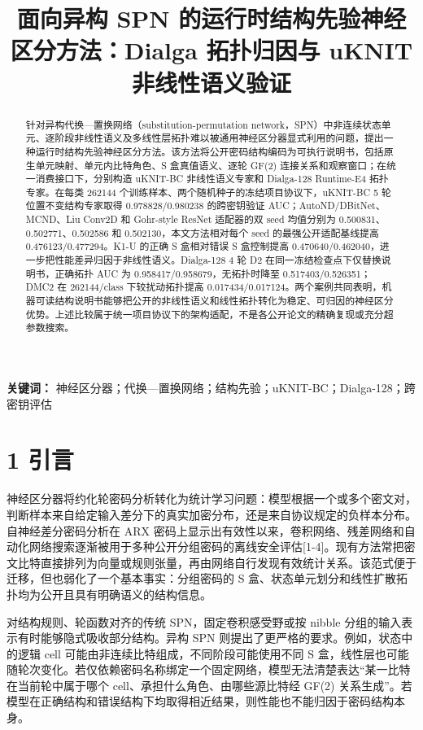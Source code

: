 \documentclass[
  a4paper,
  UTF8]{ctexart}
\title{面向异构 SPN 的运行时结构先验神经区分方法：Dialga 拓扑归因与
uKNIT 非线性语义验证}
\author{}
\date{}
\begin{document}
\maketitle
\begin{abstract}
针对异构代换---置换网络（substitution-permutation
network，SPN）中非连续状态单元、逐阶段非线性语义及多线性层拓扑难以被通用神经区分器显式利用的问题，提出一种运行时结构先验神经区分方法。该方法将公开密码结构编码为可执行说明书，包括原生单元映射、单元内比特角色、S
盒真值语义、逐轮 GF(2) 连接关系和观察窗口；在统一消费接口下，分别构造
uKNIT-BC 非线性语义专家和 Dialga-128 Runtime-E4
拓扑专家。在每类 262144 个训练样本、两个随机种子的冻结项目协议下，uKNIT-BC
5 轮位置不变结构专家取得 0.978828/0.980238 的跨密钥验证
AUC；AutoND/DBitNet、MCND、Liu Conv2D 和 Gohr-style ResNet
适配器的双 seed 均值分别为 0.500831、0.502771、0.502586 和
0.502130，本文方法相对每个 seed 的最强公开适配基线提高
0.476123/0.477294。K1-U 的正确 S 盒相对错误 S 盒控制提高
0.470640/0.462040，进一步把性能差异归因于非线性语义。Dialga-128 4 轮 D2
在同一冻结检查点下仅替换说明书，正确拓扑 AUC 为
0.958417/0.958679，无拓扑时降至 0.517403/0.526351；DMC2 在
262144/class 下较扰动拓扑提高
0.017434/0.017124。两个案例共同表明，机器可读结构说明书能够把公开的非线性语义和线性拓扑转化为稳定、可归因的神经区分优势。上述比较属于统一项目协议下的架构适配，不是各公开论文的精确复现或充分超参数搜索。
\end{abstract}

\textbf{关键词：}
神经区分器；代换---置换网络；结构先验；uKNIT-BC；Dialga-128；跨密钥评估

\hypertarget{ux5f15ux8a00}{%
\section{1 引言}\label{ux5f15ux8a00}}

神经区分器将约化轮密码分析转化为统计学习问题：模型根据一个或多个密文对，判断样本来自给定输入差分下的真实加密分布，还是来自协议规定的负样本分布。自神经差分密码分析在
ARX
密码上显示出有效性以来，卷积网络、残差网络和自动化网络搜索逐渐被用于多种公开分组密码的离线安全评估{[}1-4{]}。现有方法常把密文比特直接排列为向量或规则张量，再由网络自行发现有效统计关系。该范式便于迁移，但也弱化了一个基本事实：分组密码的
S 盒、状态单元划分和线性扩散拓扑均为公开且具有明确语义的结构信息。

对结构规则、轮函数对齐的传统 SPN，固定卷积感受野或按 nibble
分组的输入表示有时能够隐式吸收部分结构。异构 SPN
则提出了更严格的要求。例如，状态中的逻辑 cell
可能由非连续比特组成，不同阶段可能使用不同 S
盒，线性层也可能随轮次变化。若仅依赖密码名称绑定一个固定网络，模型无法清楚表达``某一比特在当前轮中属于哪个
cell、承担什么角色、由哪些源比特经 GF(2)
关系生成''。若模型在正确结构和错误结构下均取得相近结果，则性能也不能归因于密码结构本身。
\end{document}
